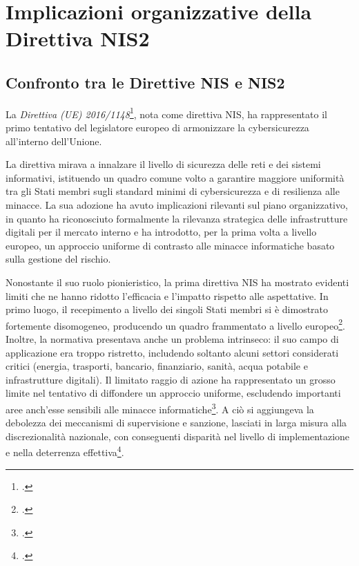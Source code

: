 \chapter{Implicazioni organizzative della Direttiva NIS2}
\label{cap:nis2}

\section{Confronto tra le Direttive NIS e NIS2}
La \textit{Direttiva (UE) 2016/1148}\footcite{nis1-directive}, nota come direttiva NIS, ha rappresentato il primo tentativo del
legislatore europeo di armonizzare la cybersicurezza all'interno dell'Unione.

La direttiva mirava a innalzare il livello di sicurezza delle reti e dei sistemi informativi, istituendo 
un quadro comune volto a garantire maggiore uniformità tra gli Stati membri sugli standard minimi di 
cybersicurezza e di resilienza alle minacce. La sua adozione ha avuto implicazioni rilevanti sul 
piano organizzativo, in quanto ha riconosciuto formalmente la rilevanza strategica delle infrastrutture digitali 
per il mercato interno e ha introdotto, per la prima volta a livello europeo, un approccio 
uniforme di contrasto alle minacce informatiche basato sulla gestione del rischio.

Nonostante il suo ruolo pionieristico, la prima direttiva NIS ha mostrato evidenti limiti
che ne hanno ridotto l'efficacia e l'impatto rispetto alle aspettative. In primo luogo, il recepimento a livello
dei singoli Stati membri si è dimostrato fortemente disomogeneo, producendo un quadro frammentato
a livello europeo\footcite[p. 5]{vandezande}. Inoltre, la normativa presentava anche un problema intrinseco: 
il suo campo di applicazione era troppo ristretto, includendo soltanto alcuni settori considerati critici 
(energia, trasporti, bancario, finanziario, sanità, acqua potabile e infrastrutture digitali). Il limitato
raggio di azione ha rappresentato un grosso limite nel tentativo di diffondere un approccio uniforme, escludendo
importanti aree anch'esse sensibili alle minacce informatiche\footcite[p. 209]{teichmann}.
A ciò si aggiungeva la debolezza dei meccanismi di supervisione e sanzione, lasciati in larga misura alla 
discrezionalità nazionale, con conseguenti disparità nel livello di implementazione e nella 
deterrenza effettiva\footcite[p. 6]{vandezande}.

